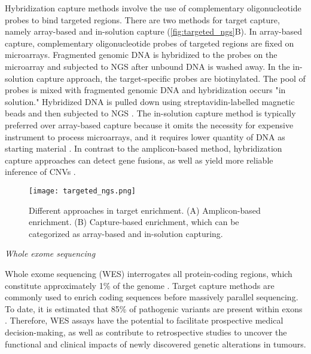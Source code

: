 Hybridization capture methods involve the use of complementary oligonucleotide probes to bind targeted regions. There are two methods for target capture, namely array-based and in-solution capture (\autoref{fig:targeted_ngs}B). In array-based capture, complementary oligonucleotide probes of targeted regions are fixed on microarrays. Fragmented genomic DNA is hybridized to the probes on the microarray and subjected to NGS after unbound DNA is washed away. In the in-solution capture approach, the target-specific probes are biotinylated. The pool of probes is mixed with fragmented genomic DNA and hybridization occurs "in solution." Hybridized DNA is pulled down using streptavidin-labelled magnetic beads and then subjected to NGS \cite{Simon2013, Gagan2015}. The in-solution capture method is typically preferred over array-based capture because it omits the necessity for expensive instrument to process microarrays, and it requires lower quantity of DNA as starting material \cite{Bodi2013, Cui2013}. In contrast to the amplicon-based method, hybridization capture approaches can detect gene fusions, as well as yield more reliable inference of CNVs \cite{Simon2013, Gagan2015}.


\begin{figure}[H]
	\centering
	\texttt{[image: targeted\_ngs.png]}
	\caption[Different approaches in target enrichment.]{Different approaches in target enrichment. (A) Amplicon-based enrichment. (B) Capture-based enrichment, which can be categorized as array-based and in-solution capturing.}
	\label{fig:targeted_ngs}
\end{figure}


\newpage
\vspace{5mm}
\noindent\textit{Whole exome sequencing}

Whole exome sequencing (\acs{WES}) interrogates all protein-coding regions, which constitute approximately 1\% of the genome \cite{Simon2013, Rabbani2014}. Target capture methods are commonly used to enrich coding sequences before massively parallel sequencing. To date, it is estimated that 85\% of pathogenic variants are present within exons \cite{Rabbani2014}. Therefore, WES assays have the potential to facilitate prospective medical decision-making, as well as contribute to retrospective studies to uncover the functional and clinical impacts of newly discovered genetic alterations in tumours.

